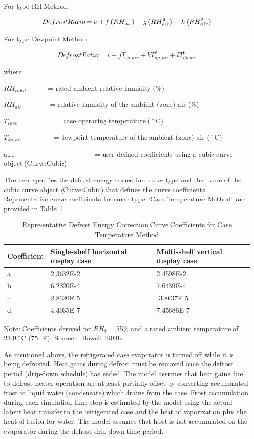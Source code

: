 For type RH Method:

\begin{equation}
  DefrostRatio = e + f \PB{RH_{air}} + g \PB{RH_{air}^2} + h \PB{RH_{air}^3}
\end{equation}

For type Dewpoint Method:

\begin{equation}
  DefrostRatio = i + j T_{dp,air} + k T_{dp,air}^2 + l T_{dp,air}^3
\end{equation}

where:

\(R{H_{rated}}\) ~~~~~ = rated ambient relative humidity (\%)

\(R{H_{air}}\) ~~~~~~~ = relative humidity of the ambient (zone) air (\%)

\({T_{case}}\) ~~~~~~~~~~ = case operating temperature (˚C)

\({T_{dp,air}}\) ~~~~~~~~ = dewpoint temperature of the ambient (zone) air (˚C)

a\ldots{}l~~~~~~~~~~~~~~~~~~~~~~~ = user-defined coefficients using a cubic curve object (Curve:Cubic)

The user specifies the defrost energy correction curve type and the name of the cubic curve object (Curve:Cubic) that defines the curve coefficients. Representative curve coefficients for curve type ``Case Temperature Method'' are provided in Table~\ref{table:representative-defrost-energy-correction}.

\begin{longtable}[c]{p{1.5in}p{2.36in}p{2.13in}}
\caption{Representative Defrost Energy Correction Curve Coefficients for Case Temperature Method \protect \label{table:representative-defrost-energy-correction}}\\
\toprule 
Coefficient & Single-shelf horizontal display case & Multi-shelf vertical display case \tabularnewline \midrule
\endhead
a & 2.3632E-2 & 2.4598E-2 \tabularnewline
b & 6.2320E-4 & 7.6439E-4 \tabularnewline
c & 2.8320E-5 & -3.8637E-5 \tabularnewline
d & 4.4035E-7 & 7.45686E-7 \tabularnewline
\bottomrule
\end{longtable}

Note: Coefficients derived for \emph{RH\(_{d}\)} = 55\% and a rated ambient temperature of 23.9˚C (75˚F). Source:~ Howell 1993b.

As mentioned above, the refrigerated case evaporator is turned off while it is being defrosted. Heat gains during defrost must be removed once the defrost period (drip-down schedule) has ended. The model assumes that heat gains due to defrost heater operation are at least partially offset by converting accumulated frost to liquid water (condensate) which drains from the case. Frost accumulation during each simulation time step is estimated by the model using the actual latent heat transfer to the refrigerated case and the heat of vaporization plus the heat of fusion for water. The model assumes that frost is not accumulated on the evaporator during the defrost drip-down time period.

